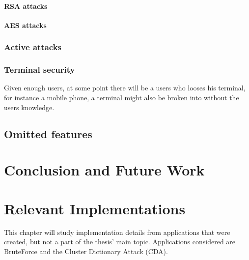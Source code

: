 \documentclass[pdftex,english,10pt,b5paper,twoside]{book}
\begin{document}
\subsubsection{RSA attacks}

\subsubsection{AES attacks}

\subsection{Active attacks}


\subsection{Terminal security}
Given enough users, at some point there will be a users who looses his
terminal, for instance a mobile phone, a terminal might also be broken into
without the users knowledge.


\section{Omitted features}


\chapter{Conclusion and Future Work}




\appendix
\appendixpage
\addappheadtotoc
\chapter{Relevant Implementations}
\label{ap:RI}
This chapter will study implementation details from applications that were
created, but not a part of the thesis' main topic. Applications considered are 
BruteForce and the Cluster Dictionary Attack (CDA).
\end{document}
